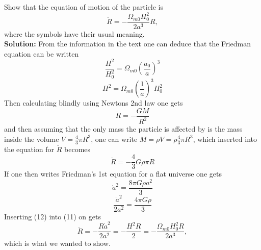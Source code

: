 \documentclass[a4paper,12pt]{article}
\begin{document}
\subsection{}
Show that the equation of motion of the particle is
\begin{equation}
\ddot{R} = -\frac{\Omega_{m0}H_0^2}{2a^3}R,
\end{equation}
where the symbols have their usual meaning.\\
\textbf{Solution:}
From the information in the text one can deduce that the Friedman equation can be written
$$\frac{H^2}{H_0^2} = \Omega_{m0}(\frac{a_0}{a})^3$$
\begin{equation}
H^2 = \Omega_{m0}(\frac{1}{a})^3H_0^2
\end{equation}
Then calculating blindly using Newtons 2nd law one gets
$$\ddot{R} = -\frac{GM}{R^2}$$
and then assuming that the only mass the particle is affected by is the mass inside the volume $V = \frac{4}{3}\pi R^3$, one can write $M = \rho V = \rho\frac{4}{3}\pi R^3$, which inserted into the equation for $\ddot{R}$ becomes
\begin{equation}
\ddot{R} = -\frac{4}{3}G\rho\pi R
\end{equation}
If one then writes Friedman's 1st equation for a flat universe one gets
$$\dot{a}^2 = \frac{8\pi G\rho a^2}{3}$$
\begin{equation}
\frac{\dot{a}^2}{2a^2} = \frac{4\pi G\rho}{3}
\end{equation}
Inserting (12) into (11) on gets
$$\ddot{R} = -\frac{R\dot{a}^2}{2a^2} = -\frac{H^2R}{2} = -\frac{\Omega_{m0}H_0^2R}{2a^3},$$
which is what we wanted to show.
\end{document}
